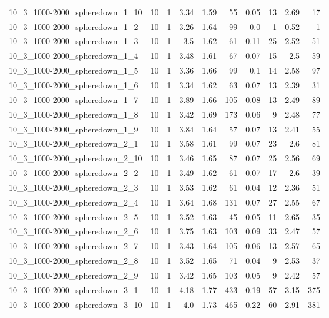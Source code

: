 \begin{center}
\begin{scriptsize}
\begin{longtable}{lrrrrrrrrr}
10\_3\_1000-2000\_spheredown\_1\_10 & 10 & 1 & 3.34 & 1.59 & 55 & 0.05 & 13 & 2.69 & 17\\
10\_3\_1000-2000\_spheredown\_1\_2 & 10 & 1 & 3.26 & 1.64 & 99 & 0.0 & 1 & 0.52 & 1\\
10\_3\_1000-2000\_spheredown\_1\_3 & 10 & 1 & 3.5 & 1.62 & 61 & 0.11 & 25 & 2.52 & 51\\
10\_3\_1000-2000\_spheredown\_1\_4 & 10 & 1 & 3.48 & 1.61 & 67 & 0.07 & 15 & 2.5 & 59\\
10\_3\_1000-2000\_spheredown\_1\_5 & 10 & 1 & 3.36 & 1.66 & 99 & 0.1 & 14 & 2.58 & 97\\
10\_3\_1000-2000\_spheredown\_1\_6 & 10 & 1 & 3.34 & 1.62 & 63 & 0.07 & 13 & 2.39 & 31\\
10\_3\_1000-2000\_spheredown\_1\_7 & 10 & 1 & 3.89 & 1.66 & 105 & 0.08 & 13 & 2.49 & 89\\
10\_3\_1000-2000\_spheredown\_1\_8 & 10 & 1 & 3.42 & 1.69 & 173 & 0.06 & 9 & 2.48 & 77\\
10\_3\_1000-2000\_spheredown\_1\_9 & 10 & 1 & 3.84 & 1.64 & 57 & 0.07 & 13 & 2.41 & 55\\
10\_3\_1000-2000\_spheredown\_2\_1 & 10 & 1 & 3.58 & 1.61 & 99 & 0.07 & 23 & 2.6 & 81\\
10\_3\_1000-2000\_spheredown\_2\_10 & 10 & 1 & 3.46 & 1.65 & 87 & 0.07 & 25 & 2.56 & 69\\
10\_3\_1000-2000\_spheredown\_2\_2 & 10 & 1 & 3.49 & 1.62 & 61 & 0.07 & 17 & 2.6 & 39\\
10\_3\_1000-2000\_spheredown\_2\_3 & 10 & 1 & 3.53 & 1.62 & 61 & 0.04 & 12 & 2.36 & 51\\
10\_3\_1000-2000\_spheredown\_2\_4 & 10 & 1 & 3.64 & 1.68 & 131 & 0.07 & 27 & 2.55 & 67\\
10\_3\_1000-2000\_spheredown\_2\_5 & 10 & 1 & 3.52 & 1.63 & 45 & 0.05 & 11 & 2.65 & 35\\
10\_3\_1000-2000\_spheredown\_2\_6 & 10 & 1 & 3.75 & 1.63 & 103 & 0.09 & 33 & 2.47 & 57\\
10\_3\_1000-2000\_spheredown\_2\_7 & 10 & 1 & 3.43 & 1.64 & 105 & 0.06 & 13 & 2.57 & 65\\
10\_3\_1000-2000\_spheredown\_2\_8 & 10 & 1 & 3.52 & 1.65 & 71 & 0.04 & 9 & 2.53 & 37\\
10\_3\_1000-2000\_spheredown\_2\_9 & 10 & 1 & 3.42 & 1.65 & 103 & 0.05 & 9 & 2.42 & 57\\
10\_3\_1000-2000\_spheredown\_3\_1 & 10 & 1 & 4.18 & 1.77 & 433 & 0.19 & 57 & 3.15 & 375\\
10\_3\_1000-2000\_spheredown\_3\_10 & 10 & 1 & 4.0 & 1.73 & 465 & 0.22 & 60 & 2.91 & 381\\

\end{longtable}
\end{scriptsize}
\end{center}
